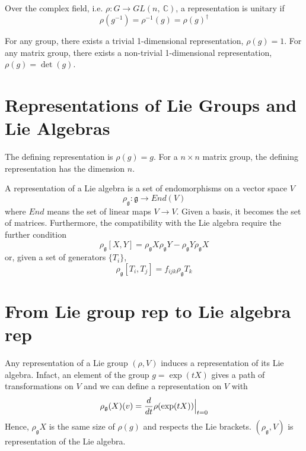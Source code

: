     \begin{definition}
        Over the complex field, i.e. $\rho \colon G \rightarrow GL(n, ~\mathbb C)$, a representation is unitary if 
        \begin{equation*}
            \rho(g^{-1}) = \rho^{-1}(g) = \rho(g)^{\dagger}
        \end{equation*}
    \end{definition}

    For any group, there exists a trivial 1-dimensional representation,  $\rho(g) = 1$. For any matrix group, there exists a non-trivial 1-dimensional representation, $\rho(g) = \det(g)$.

    \section{Representations of Lie Groups and Lie Algebras}

    The defining representation is $\rho(g) = g$. For a $n \times n$ matrix group, the defining representation has the dimension $n$.

    A representation of a Lie algebra is a set of endomorphisms on a vector space $V$ 
    \begin{equation*}
        \rho_{\mathfrak g} \colon \mathfrak g \rightarrow End(V)
    \end{equation*}
    where $End$ means the set of linear maps $V \rightarrow V$. Given a basis, it becomes the set of matrices. Furthermore, the compatibility with the Lie algebra require the further condition 
    \begin{equation*}
        \rho_{\mathfrak g} [X, Y] = \rho_{\mathfrak g} X \rho_{\mathfrak g} Y - \rho_{\mathfrak g} Y \rho_{\mathfrak g} X
    \end{equation*}
    or, given a set of generators $\{T_i\}$,
    \begin{equation*}
        \rho_{\mathfrak g} [T_i, T_j] = f_{ijk} \rho_{\mathfrak g} T_k
    \end{equation*}

\section{From Lie group rep to Lie algebra rep}

    Any representation of a Lie group $(\rho, V)$ induces a representation of its Lie algebra. Infact, an element of the group $g = \exp(tX)$ gives a path of transformations on $V$ and we can define a representation on $V$ with 
    \begin{equation*}
        \rho_{\mathfrak g} (X) (v) = \frac{d}{dt} \rho (\exp(tX)) \Big \vert_{t=0}
    \end{equation*}
    Hence, $\rho_{\mathfrak g} X $ is the same size of $\rho(g)$ and respects the Lie brackets. $(\rho_{\mathfrak g}, V)$ is representation of the Lie algebra. 

